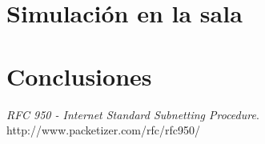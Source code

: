 \documentclass[12pt,titlepage]{article}
\begin{document}
\section{Simulación en la sala}

\section{Conclusiones}



\newpage

\begin{thebibliography}{9}

  \emph{RFC 950 - Internet Standard Subnetting Procedure}. \\
  http://www.packetizer.com/rfc/rfc950/

\end{thebibliography}


\end{document}
